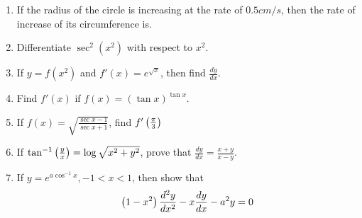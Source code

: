 \begin{enumerate}

\item If the radius of the circle is increasing at the rate of $0.5cm/s$, then the rate of increase of its circumference is.

\item Differentiate $\sec^2(x^2)$ with respect to $x^2$.

\item If $y=f(x^2)$ and $f'(x)=e^{\sqrt{x}}$, then find $\frac{dy}{dx}$.

\item Find $f'(x)$ if $f(x)=(\tan x)^{\tan x}$.

\item If $f(x)=\sqrt{\frac{\sec x -1}{\sec x + 1}}$, find $f'\left(\frac{\pi}{3}\right)$

\item If $\tan^{-1}\left(\frac{y}{x}\right)=\log\sqrt{x^2+y^2}$, prove that $\frac{dy}{dx}=\frac{x+y}{x-y}$.

\item If $y=e^{a \cos^{-1}x}, -1<x<1$, then show that
	\begin{align}	
		\left(1-x^2\right)\frac{d^2y}{dx^2}-x\frac{dy}{dx}-a^2y=0
	\end{align}
\end{enumerate}